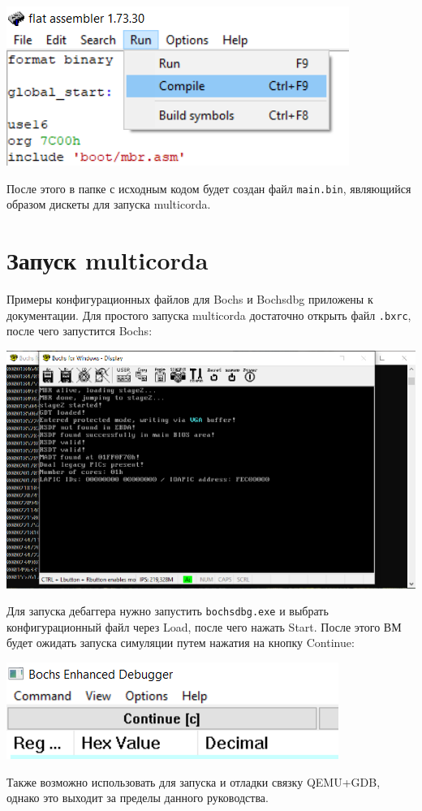 \begin{center}
\includegraphics{pictures/2-compiling}
\end{center}

После этого в папке с исходным кодом будет создан файл \verb|main.bin|, являющийся образом дискеты для запуска multicorda.

\section{Запуск multicorda}

Примеры конфигурационных файлов для Bochs и Bochsdbg приложены к документации. Для простого запуска multicorda достаточно открыть файл \verb|.bxrc|, после чего запустится Bochs:

\begin{center}
\includegraphics{pictures/2-simple-launch}
\end{center}

Для запуска дебаггера нужно запустить \verb|bochsdbg.exe| и выбрать конфигурационный файл через Load, после чего нажать Start. После этого ВМ будет ожидать запуска симуляции путем нажатия на кнопку Continue:

\begin{center}
\includegraphics{pictures/2-start-debugging}
\end{center}

Также возможно использовать для запуска и отладки связку QEMU+GDB, однако это выходит за пределы данного руководства.
